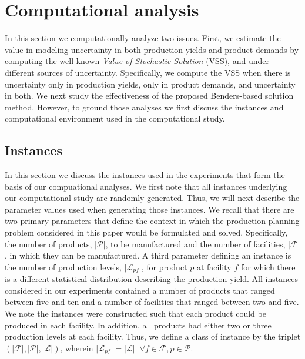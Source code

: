 \documentclass[12pt]{article}
\theoremstyle{thmstylethree}%
\begin{document}
\section{Computational analysis}
\label{sec:comp_analysis}
\noindent
In this section we computationally analyze two issues. First, we estimate the value in modeling uncertainty in both production yields and product demands by computing the well-known \textit{Value of Stochastic Solution} (VSS), and under different sources of uncertainty. Specifically, we compute the VSS when there is uncertainty only in production yields, only in product demands, and uncertainty in both. We next study the effectiveness of the proposed Benders-based solution method. However, to ground those analyses we first discuss the instances and computational environment used in the computational study. 

\subsection{Instances}
\label{subsec:instances}
\noindent
In this section we  discuss the instances used in the experiments that form the basis of our compuational analyses.  We first note that all instances underlying our computational study are randomly generated. Thus, we will next describe the parameter values used when generating those instances. We recall that there are two primary parameters that define the context in which the production planning problem considered in this paper would be formulated and solved. Specifically, the number of products, $\vert \mathcal{P} \vert$, to be manufactured and the number of facilities, $\vert \mathcal{F} \vert$, in which they can be manufactured. A third parameter defining an instance is the number of production levels, $\vert \mathcal{L}_{pf} \vert$, for product $p$ at facility $f$ for which there is a different statistical distribution describing the production yield. All instances considered in our experiments contained a number of products that ranged between five and ten and a number of facilities that ranged between two and five. We note the instances were constructed such that each product could be produced in each facility. In addition, all products had either two or three production levels at each facility.  Thus, we define a class of instance by the triplet $(\vert \mathcal{F} \vert, \vert \mathcal{P} \vert, \vert \mathcal{L} \vert)$, wherein $\vert \mathcal{L}_{pf} \vert = \vert \mathcal{L} \vert \;\; \forall f \in \mathcal{F}, p \in \mathcal{P}.$
\end{document}
